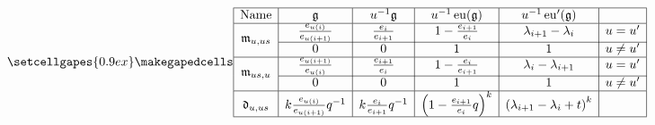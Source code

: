 \documentclass[border={7pt 0pt 7pt 0pt},varwidth]{standalone}
\DeclareMathOperator{\eu}{\operatorname{eu}}
\begin{document}
\begin{table}[ht]
 \[
 \setcellgapes{0.9ex}\makegapedcells
\centering
 \begin{array}{|c|c|c|c|c|c|}
\hline
\text{Name}         & \mathfrak{g}                 & u^{-1}\mathfrak{g}                                           & u^{-1}\eu(\mathfrak{g})                                & u^{-1}\eu'(\mathfrak{g})                                 &           \\ \hline
\multirow{2}{*}{$\mathfrak{m}_{u,us}$} & \frac{e_{u(i)}}{e_{u(i+1)}}  & \frac{e_{i}}{e_{i+1}}   & 1-\frac{e_{i+1}}{e_{i}}                  & \lambda_{i+1}-\lambda_{i}                  & u=u'      \\ \cline{2-6}
                    & 0                            & 0                                                            & 1                                                      & 1                                                        & u \neq u' \\ \hline
\multirow{2}{*}{$\mathfrak{m}_{us,u}$} & \frac{e_{u(i+1)}}{e_{u(i)}}  & \frac{e_{i+1}}{e_{i}}   & 1-\frac{e_{i}}{e_{i+1}}                  & \lambda_{i}-\lambda_{i+1}                  & u=u'      \\ \cline{2-6}
                    & 0                            & 0                                                            & 1                                                      & 1                                                        & u \neq u' \\ \hline
\mathfrak{d}_{u,us} & k\frac{e_{u(i)}}{e_{u(i+1)}}q^{-1} & k\frac{e_{i}}{e_{i+1}}q^{-1} & \left(1-\frac{e_{i+1}}{e_{i}}q\right)^{k} & \left(\lambda_{i+1}-\lambda_{i}+t\right)^{k} &           \\ \hline
 \end{array}
 \]
        
\end{table}
\end{document}
